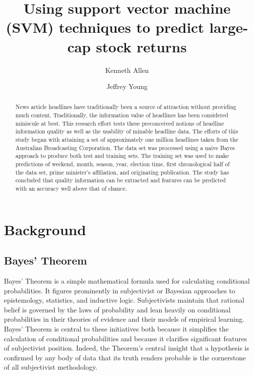 \documentclass[format=acmlarge]{acmart}
\begin{document}
\title{Using support vector machine (SVM) techniques to predict large-cap stock returns}

\author{Kenneth Allen}

\author{Jeffrey Young}

\begin{abstract}
News article headlines have traditionally been a source of attraction without providing much content.  Traditionally, the information value of headlines has been considered miniscule at best. This research effort tests these preconceived notions of headline information quality as well as the usability of minable headline data.  The efforts of this study began with attaining a set of approximately one million headlines taken from the Australian Broadcasting Corporation.  The data set was processed using a naive Bayes approach to produce both test and training sets.  The training set was used to make predictions of weekend, month, season, year, election time, first chronological half of the data set, prime minister's affiliation, and originating publication.  The study has concluded that quality information can be extracted and features can be predicted with an accuracy well above that of chance.
\end{abstract}


\maketitle

\section{Background}
\subsection{Bayes' Theorem}
Bayes' Theorem is a simple mathematical formula used for calculating conditional probabilities. It figures prominently in subjectivist or Bayesian approaches to epistemology, statistics, and inductive logic. Subjectivists maintain that rational belief is governed by the laws of probability and lean heavily on conditional probabilities in their theories of evidence and their models of empirical learning. Bayes' Theorem is central to these initiatives both because it simplifies the calculation of conditional probabilities and because it clarifies significant features of subjectivist position. Indeed, the Theorem's central insight that a hypothesis is confirmed by any body of data that its truth renders probable is the cornerstone of all subjectivist methodology.
\end{document}
